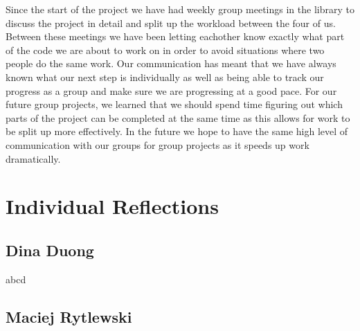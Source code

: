 \documentclass[11pt]{article}
\begin{document}
Since the start of the project we have had weekly group meetings in the library to discuss the project in
detail and split up the workload between the four of us. Between these meetings we have been letting eachother 
know exactly what part of the code we are about to work on in order to avoid situations where two people do the 
same work. Our communication has meant that we have always known what our next step is individually as well as 
being able to track our progress as a group and make sure we are progressing at a good pace.
For our future group projects, we learned that we should spend time figuring out which parts of the project can 
be completed at the same time as this allows for work to be split up more effectively.
In the future we hope to have the same high level of communication with our groups for group projects as it 
speeds up work dramatically.

\section{Individual Reflections}

\subsection{Dina Duong}

abcd

\subsection{Maciej Rytlewski}
\end{document}

